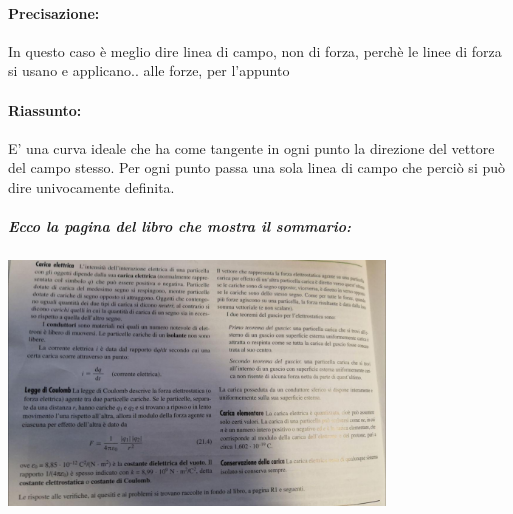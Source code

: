 \documentclass[12pt, a4paper, openany, oneside]{book}
\begin{document}
\paragraph{Precisazione: }In questo caso è meglio dire linea di campo, non
di forza, perchè le linee di forza si usano e applicano.. alle forze, per 
l'appunto
\paragraph{Riassunto: }E' una curva ideale che ha come tangente in ogni punto la
direzione del vettore del campo stesso. Per ogni punto passa una sola linea di 
campo che perciò si può dire univocamente definita.
\subparagraph{Ecco la pagina del libro che mostra il sommario:}
\begin{center}
	\includegraphics[width=0.75\textwidth]{20}
\end{center}	
    
\end{document}

